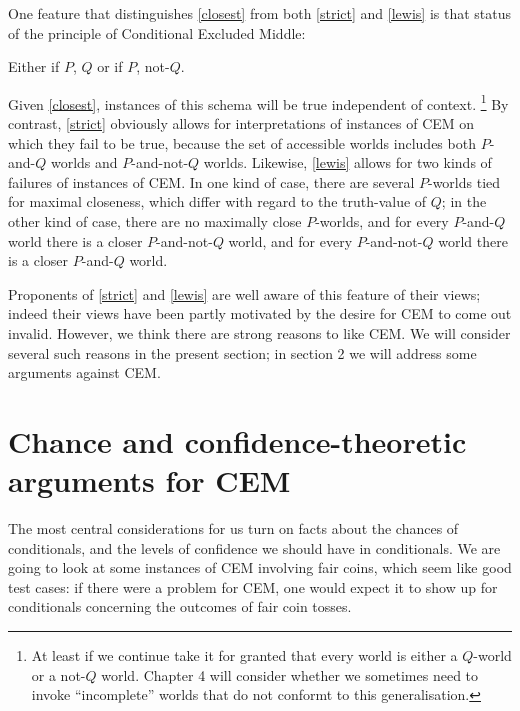 \documentclass[If.tex]{subfiles}
\begin{document}
One feature that distinguishes \ref{closest} from both \ref{strict} and \ref{lewis} is
that status of the principle of Conditional Excluded Middle:
\begin{prop}
	\litem[CEM] \label{CEM}
	Either if $P$, $Q$ or if $P$, not-$Q$.
\end{prop}
Given \ref{closest}, instances of this schema will be true independent of context.%
\footnote{At least if we continue take it for granted that every world is either a $Q$-world or a not-$Q$ world.  Chapter 4 will consider whether we sometimes need to invoke “incomplete” worlds that do not conformt to this generalisation.} 
By contrast, \ref{strict} obviously allows for interpretations of instances of CEM on which they fail to be true, because the set of accessible worlds includes both $P$-and-$Q$ worlds and $P$-and-not-$Q$ worlds. Likewise, \ref{lewis} allows for two kinds of failures of instances of CEM. In one kind of case, there are several $P$-worlds tied for maximal closeness, which differ with regard to the truth-value of $Q$; in the other kind of case, there are no maximally close $P$-worlds, and for every $P$-and-$Q$ world there is a closer $P$-and-not-$Q$ world, and for every $P$-and-not-$Q$ world there is a closer $P$-and-$Q$ world.

Proponents of \ref{strict} and \ref{lewis} are well aware of this feature of their views; indeed their views have been partly motivated by the desire for CEM to come out invalid. However, we think there are strong reasons to like CEM. We will consider several such reasons in the present section; in section 2 we will address some arguments against CEM.

\section{Chance and confidence-theoretic arguments for CEM}
\label{sect:probs}
The most central considerations for us turn on facts about the chances of conditionals, and the levels of confidence we should have in conditionals. We are going to look at some instances of CEM involving fair coins, which seem like good test cases: if there were a problem for CEM, one would expect it to show up for conditionals concerning the outcomes of fair coin tosses.
\end{document}
